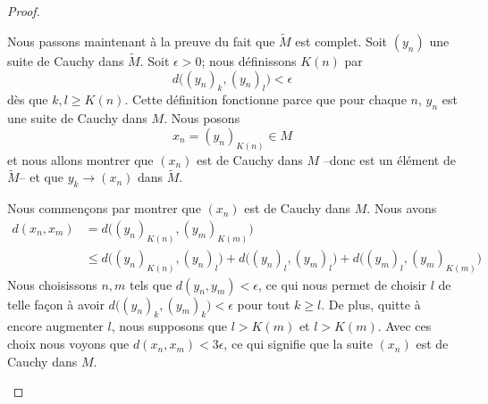 \begin{proof}
\begin{subproof}
\begin{subproof}
			\spitem[Complétude]
			Nous passons maintenant à la preuve du fait que \( \tilde M\) est complet. Soit \( (y_n)\) une suite de Cauchy dans \( \tilde M\). Soit \( \epsilon>0\); nous définissons \( K(n)\) par
			\begin{equation}
				d\big( (y_n)_k,(y_n)_l \big)<\epsilon
			\end{equation}
			dès que \( k,l\geq K(n)\). Cette définition fonctionne parce que pour chaque \( n\), \( y_n\) est une suite de Cauchy dans \( M\). Nous posons
			\begin{equation}
				x_n=(y_n)_{K(n)}\in M
			\end{equation}
			et nous allons montrer que \( (x_n)\) est de Cauchy dans \( M\) --donc est un élément de \( \tilde M\)-- et que \( y_k\to (x_n)\) dans \( \tilde M\).

			Nous commençons par montrer que \( (x_n)\) est de Cauchy dans \( M\). Nous avons
			\begin{subequations}
				\begin{align}
					d(x_n,x_m) & =d\big( (y_n)_{K(n)},(y_m)_{K(m)} \big)                                                                   \\
					           & \leq d\big( (y_n)_{K(n)},(y_n)_l \big)+d\big( (y_n)_{l},(y_m)_l \big)+d\big( (y_m)_{l},(y_m)_{K(m)} \big)
				\end{align}
			\end{subequations}
			Nous choisissons \( n,m\) tels que \( d(y_n,y_m)<\epsilon\), ce qui nous permet de choisir \( l\) de telle façon à avoir \( d\big( (y_n)_k,(y_m)_k \big)<\epsilon\) pour tout \( k\geq l\). De plus, quitte à encore augmenter \( l\), nous supposons que \( l>K(m)\) et \( l>K(m)\). Avec ces choix nous voyons que \( d(x_n,x_m)<3\epsilon\), ce qui signifie que la suite \( (x_n)\) est de Cauchy dans \( M\).


\end{subproof}
\end{subproof}
\end{proof}
